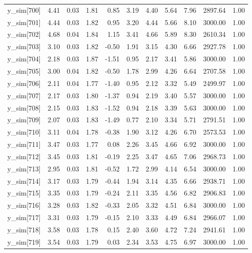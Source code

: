 \begin{table}[ht]
\begin{tabular}{rrrrrrrrrrr}
  y\_sim[700] & 4.41 & 0.03 & 1.81 & 0.85 & 3.19 & 4.40 & 5.64 & 7.96 & 2897.64 & 1.00 \\ 
  y\_sim[701] & 4.44 & 0.03 & 1.82 & 0.95 & 3.20 & 4.44 & 5.66 & 8.10 & 3000.00 & 1.00 \\ 
  y\_sim[702] & 4.68 & 0.04 & 1.84 & 1.15 & 3.41 & 4.66 & 5.89 & 8.30 & 2610.34 & 1.00 \\ 
  y\_sim[703] & 3.10 & 0.03 & 1.82 & -0.50 & 1.91 & 3.15 & 4.30 & 6.66 & 2927.78 & 1.00 \\ 
  y\_sim[704] & 2.18 & 0.03 & 1.87 & -1.51 & 0.95 & 2.17 & 3.41 & 5.86 & 3000.00 & 1.00 \\ 
  y\_sim[705] & 3.00 & 0.04 & 1.82 & -0.50 & 1.78 & 2.99 & 4.26 & 6.64 & 2707.58 & 1.00 \\ 
  y\_sim[706] & 2.11 & 0.04 & 1.77 & -1.40 & 0.95 & 2.12 & 3.32 & 5.49 & 2499.97 & 1.00 \\ 
  y\_sim[707] & 2.17 & 0.03 & 1.80 & -1.37 & 0.94 & 2.19 & 3.40 & 5.57 & 3000.00 & 1.00 \\ 
  y\_sim[708] & 2.15 & 0.03 & 1.83 & -1.52 & 0.94 & 2.18 & 3.39 & 5.63 & 3000.00 & 1.00 \\ 
  y\_sim[709] & 2.07 & 0.03 & 1.83 & -1.49 & 0.77 & 2.10 & 3.34 & 5.71 & 2791.51 & 1.00 \\ 
  y\_sim[710] & 3.11 & 0.04 & 1.78 & -0.38 & 1.90 & 3.12 & 4.26 & 6.70 & 2573.53 & 1.00 \\ 
  y\_sim[711] & 3.47 & 0.03 & 1.77 & 0.08 & 2.26 & 3.45 & 4.66 & 6.92 & 3000.00 & 1.00 \\ 
  y\_sim[712] & 3.45 & 0.03 & 1.81 & -0.19 & 2.25 & 3.47 & 4.65 & 7.06 & 2968.73 & 1.00 \\ 
  y\_sim[713] & 2.95 & 0.03 & 1.81 & -0.52 & 1.72 & 2.99 & 4.14 & 6.54 & 3000.00 & 1.00 \\ 
  y\_sim[714] & 3.17 & 0.03 & 1.79 & -0.44 & 1.94 & 3.14 & 4.35 & 6.66 & 2938.71 & 1.00 \\ 
  y\_sim[715] & 3.35 & 0.03 & 1.79 & -0.24 & 2.11 & 3.35 & 4.56 & 6.82 & 2906.83 & 1.00 \\ 
  y\_sim[716] & 3.28 & 0.03 & 1.82 & -0.33 & 2.05 & 3.32 & 4.51 & 6.84 & 3000.00 & 1.00 \\ 
  y\_sim[717] & 3.31 & 0.03 & 1.79 & -0.15 & 2.10 & 3.33 & 4.49 & 6.84 & 2966.07 & 1.00 \\ 
  y\_sim[718] & 3.58 & 0.03 & 1.78 & 0.15 & 2.40 & 3.60 & 4.72 & 7.24 & 2941.61 & 1.00 \\ 
  y\_sim[719] & 3.54 & 0.03 & 1.79 & 0.03 & 2.34 & 3.53 & 4.75 & 6.97 & 3000.00 & 1.00 \\ 

\end{tabular}
\end{table}
